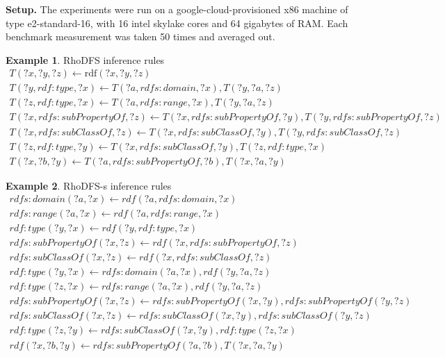 \documentclass[sigconf,screen,review,natbib]{acmart}
\theoremstyle{definition}
\newtheorem{exmp}{Example}[section]
\begin{document}
\textbf{Setup.} The experiments were run on a google-cloud-provisioned x86 machine of type e2-standard-16, with 16 intel skylake cores and 64 gigabytes of RAM. Each
benchmark measurement was taken 50 times and averaged out.

\begin{exmp}{RhoDFS inference rules}
	\tiny
	\begin{align}
		T(?x, ?y, ?z) \leftarrow \text{rdf}(?x, ?y, ?z)                                                       \\
		T(?y, rdf:type, ?x) \leftarrow T(?a, rdfs:domain, ?x), T(?y, ?a, ?z)                                  \\
		T(?z, rdf:type, ?x) \leftarrow T(?a, rdfs:range, ?x), T(?y, ?a, ?z)                                   \\
		T(?x, rdfs:subPropertyOf, ?z) \leftarrow T(?x, rdfs:subPropertyOf, ?y), T(?y, rdfs:subPropertyOf, ?z) \\
		T(?x, rdfs:subClassOf, ?z) \leftarrow T(?x, rdfs:subClassOf, ?y), T(?y, rdfs:subClassOf, ?z)          \\
		T(?z, rdf:type, ?y) \leftarrow T(?x, rdfs:subClassOf, ?y), T(?z, rdf:type, ?x)                        \\
		T(?x, ?b, ?y) \leftarrow T(?a, rdfs:subPropertyOf, ?b), T(?x, ?a, ?y)
	\end{align}
	\label{program:rhodfs}
\end{exmp}

\begin{exmp}{RhoDFS-s inference rules}
	\tiny
	\begin{align}
		rdfs:domain(?a, ?x) \leftarrow rdf(?a, rdfs:domain, ?x)                                      \\
		rdfs:range(?a, ?x) \leftarrow rdf(?a, rdfs:range, ?x)                                        \\
		rdf:type(?y, ?x) \leftarrow rdf(?y, rdf:type, ?x)                                            \\
		rdfs:subPropertyOf(?x, ?z) \leftarrow rdf(?x, rdfs:subPropertyOf, ?z)                        \\
		rdfs:subClassOf(?x, ?z) \leftarrow rdf(?x, rdfs:subClassOf, ?z)                              \\
		rdf:type(?y, ?x) \leftarrow rdfs:domain(?a, ?x), rdf(?y, ?a, ?z)                             \\
		rdf:type(?z, ?x) \leftarrow rdfs:range(?a, ?x), rdf(?y, ?a, ?z)                              \\
		rdfs:subPropertyOf(?x, ?z) \leftarrow rdfs:subPropertyOf(?x, ?y), rdfs:subPropertyOf(?y, ?z) \\
		rdfs:subClassOf(?x, ?z) \leftarrow rdfs:subClassOf(?x, ?y), rdfs:subClassOf(?y, ?z)          \\
		rdf:type(?z, ?y) \leftarrow rdfs:subClassOf(?x, ?y), rdf:type(?z, ?x)                        \\
		rdf(?x, ?b, ?y) \leftarrow rdfs:subPropertyOf(?a, ?b), T(?x, ?a, ?y)
	\end{align}
	\label{program:rhodfss}
\end{exmp}
\end{document}
